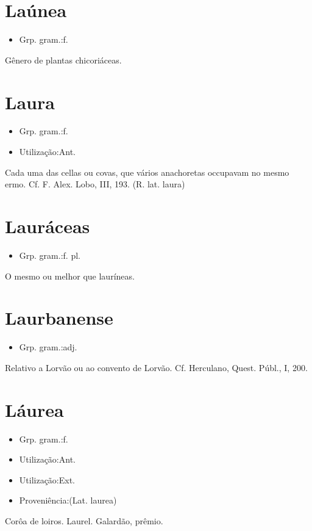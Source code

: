 \section{Laúnea}
\begin{itemize}
\item {Grp. gram.:f.}
\end{itemize}
Gênero de plantas chicoriáceas.
\section{Laura}
\begin{itemize}
\item {Grp. gram.:f.}
\end{itemize}
\begin{itemize}
\item {Utilização:Ant.}
\end{itemize}
Cada uma das cellas ou covas, que vários anachoretas occupavam no mesmo ermo. Cf. F. Alex. Lobo, III, 193.
(R. lat. \textunderscore laura\textunderscore )
\section{Lauráceas}
\begin{itemize}
\item {Grp. gram.:f. pl.}
\end{itemize}
O mesmo ou melhor que \textunderscore lauríneas\textunderscore .
\section{Laurbanense}
\begin{itemize}
\item {Grp. gram.:adj.}
\end{itemize}
Relativo a Lorvão ou ao convento de Lorvão. Cf. Herculano, \textunderscore Quest. Públ.\textunderscore , I, 200.
\section{Láurea}
\begin{itemize}
\item {Grp. gram.:f.}
\end{itemize}
\begin{itemize}
\item {Utilização:Ant.}
\end{itemize}
\begin{itemize}
\item {Utilização:Ext.}
\end{itemize}
\begin{itemize}
\item {Proveniência:(Lat. \textunderscore laurea\textunderscore )}
\end{itemize}
Corôa de loiros.
Laurel.
Galardão, prêmio.
